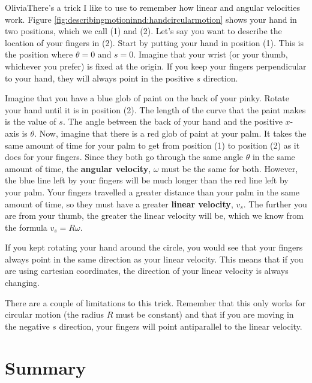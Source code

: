 \begin{studentOpinion}{Olivia}There's a trick I like to use to remember how linear and angular velocities work. Figure \ref{fig:describingmotioninnd:handcircularmotion} shows your hand in two positions, which we call (1) and (2).
Let's say you want to describe the location of your fingers in (2). Start by putting your hand in position (1). This is the position where $\theta=0$ and $s=0$. Imagine that your wrist (or your thumb, whichever you prefer) is fixed at the origin. If you keep your fingers perpendicular to your hand, they will always point in the positive $s$ direction. 

Imagine that you have a blue glob of paint on the back of your pinky. Rotate your hand until it is in position (2). The length of the curve that the paint makes is the value of $s$. The angle between the back of your hand and the positive $x$-axis is $\theta$. Now, imagine that there is a red glob of paint at your palm. It takes the same amount of time for your palm to get from position (1) to position (2) as it does for your fingers. Since they both go through the same angle $\theta$ in the same amount of time, the \textbf{angular velocity}, $\omega$ must be the same for both. However, the blue line left by your fingers will be much longer than the red line left by your palm. Your fingers travelled a greater distance than your palm in the same amount of time, so they must have a greater \textbf{linear velocity}, $v_s$. The further you are from your thumb, the greater the linear velocity will be, which we know from the formula $v_s=R\omega$.

If you kept rotating your hand around the circle, you would see that your fingers always point in the same  direction as your linear velocity. This means that if you are using cartesian coordinates, the direction of your linear velocity is always changing.

There are a couple of limitations to this trick. Remember that this only works for circular motion (the radius $R$ must be constant) and that if you are moving in the negative $s$ direction, your fingers will point antiparallel to the linear velocity.
\end{studentOpinion}



\newpage
\section{Summary}

